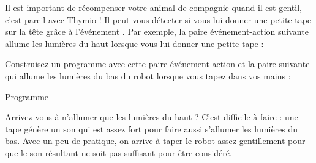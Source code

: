 

\newpage


Il est important de récompenser votre animal de compagnie quand il est gentil, c'est pareil avec Thymio !
Il peut vous détecter si vous lui donner une petite tape sur la tête grâce à l'événement .
Par exemple, la paire événement-action suivante allume les lumières du haut lorsque vous lui donner une petite tape : 

Construisez un programme avec cette paire événement-action et la paire suivante qui allume les lumières du bas du robot lorsque vous tapez dans vos mains : 

{\raggedleft \hfill Programme }

Arrivez-vous à n'allumer que les lumières du haut ?
C'est difficile à faire : une tape génère un son qui est assez fort pour faire aussi s'allumer les lumières du bas.
Avec un peu de pratique, on arrive à taper le robot assez gentillement pour que le son résultant ne soit pas suffisant pour être considéré.

